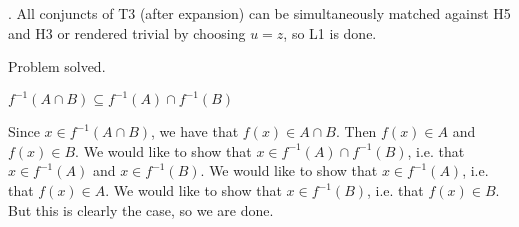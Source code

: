 \documentclass[a4paper,twoside,12pt]{article} %
\makeatletter
\DeclareRobustCommand{\_}{%
  \leavevmode\vbox{%
    \hrule\@width.4em
          \@height-.16ex
          \@depth\dimexpr.16ex+.28pt\relax}}
\newenvironment{fit}{\begin{adjustbox}{max width=\textwidth,max totalheight=\textheight,keepaspectratio}}{\end{adjustbox}}
\makeatother
\begin{document}
\begin{steps}
. All conjuncts of T3 (after expansion) can be simultaneously matched against H5 and H3 or rendered trivial by choosing $u = z$, so L1 is done.\nopagebreak[4] 
\nopagebreak[4] 
\smallskip\nopagebreak[4] 

\begin{fit}%
\end{fit}

Problem solved.
\cleardoublepage

\end{steps}
{\begin{center} \large \textbf{$f^{-1}(A \cap B) \subseteq f^{-1}(A) \cap f^{-1}(B)$}\end{center}}\nopagebreak[4]

\begin{center}
\begin{minipage}{120mm}
Since $x\in f^{-1}(A\cap B)$, we have that $f(x)\in A\cap B$. Then $f(x)\in A$ and $f(x)\in B$. We would like to show that $x\in f^{-1}(A)\cap f^{-1}(B)$, i.e. that $x\in f^{-1}(A)$ and $x\in f^{-1}(B)$. We would like to show that $x\in f^{-1}(A)$, i.e. that $f(x)\in A$. We would like to show that $x\in f^{-1}(B)$, i.e. that $f(x)\in B$. But this is clearly the case, so we are done.
\end{minipage}
\end{center}
\end{document}
